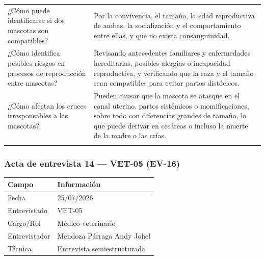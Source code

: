 \documentclass[journal,onecolumn]{IEEEtran}
\begin{document}
{\begin{longtable}{@{}p{5.6cm} p{9.4cm}@{}}
			¿Cómo puede identificarse si dos mascotas son compatibles? & Por la convivencia, el tamaño, la edad reproductiva de ambas, la socialización y el comportamiento entre ellas, y que no exista consanguinidad. \\ \addlinespace
			
			¿Cómo identifica posibles riesgos en procesos de reproducción entre mascotas? & Revisando antecedentes familiares y enfermedades hereditarias, posibles alergias o incapacidad reproductiva, y verificando que la raza y el tamaño sean compatibles para evitar partos distócicos. \\ \addlinespace
			
			¿Cómo afectan los cruces irresponsables a las mascotas? & Pueden causar que la mascota se atasque en el canal uterino, partos sistémicos o momificaciones, sobre todo con diferencias grandes de tamaño, lo que puede derivar en cesáreas o incluso la muerte de la madre o las crías. \\ \addlinespace
			
		\end{longtable}
	}
	
	
	\subsubsection*{Acta de entrevista 14 --- VET-05 (EV-16)}
	
	\begin{table}[H]
		\centering\small
		\begin{tabularx}{\textwidth}{@{}l X@{}}
			\toprule
			\textbf{Campo} & \textbf{Información} \\
			\midrule
			
			Fecha & 25/07/2026 \\
			
			Entrevistado & VET-05 \\
			
			Cargo/Rol & Médico veterinario \\
			
			Entrevistador & Mendoza Párraga Andy Johel \\
			
			Técnica & Entrevista semiestructurada \\
			
			\bottomrule
		\end{tabularx}
	\end{table}
	
\end{document}
